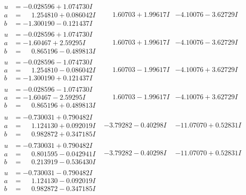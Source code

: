 \documentclass[1p]{elsarticle_modified}
\theoremstyle{definition}
\begin{document}
$$\begin{array}{c|c|c}
\begin{aligned}
u &= -0.028596 + 1.074730 I \\
a &= \phantom{-}1.254810 + 0.086042 I \\
b &= -1.300190 - 0.121437 I\end{aligned}
 & \phantom{-}1.60703 + 1.99617 I & -4.10076 - 3.62729 I \\ \hline\begin{aligned}
u &= -0.028596 + 1.074730 I \\
a &= -1.60467 + 2.59295 I \\
b &= \phantom{-}0.865196 - 0.489813 I\end{aligned}
 & \phantom{-}1.60703 + 1.99617 I & -4.10076 - 3.62729 I \\ \hline\begin{aligned}
u &= -0.028596 - 1.074730 I \\
a &= \phantom{-}1.254810 - 0.086042 I \\
b &= -1.300190 + 0.121437 I\end{aligned}
 & \phantom{-}1.60703 - 1.99617 I & -4.10076 + 3.62729 I \\ \hline\begin{aligned}
u &= -0.028596 - 1.074730 I \\
a &= -1.60467 - 2.59295 I \\
b &= \phantom{-}0.865196 + 0.489813 I\end{aligned}
 & \phantom{-}1.60703 - 1.99617 I & -4.10076 + 3.62729 I \\ \hline\begin{aligned}
u &= -0.730031 + 0.790482 I \\
a &= \phantom{-}1.124130 + 0.092019 I \\
b &= \phantom{-}0.982872 + 0.347185 I\end{aligned}
 & -3.79282 - 0.40298 I & -11.07070 + 0.52831 I \\ \hline\begin{aligned}
u &= -0.730031 + 0.790482 I \\
a &= \phantom{-}0.801595 - 0.042941 I \\
b &= \phantom{-}0.213919 - 0.536430 I\end{aligned}
 & -3.79282 - 0.40298 I & -11.07070 + 0.52831 I \\ \hline\begin{aligned}
u &= -0.730031 - 0.790482 I \\
a &= \phantom{-}1.124130 - 0.092019 I \\
b &= \phantom{-}0.982872 - 0.347185 I\end{aligned}

\end{array}$$
\end{document}
